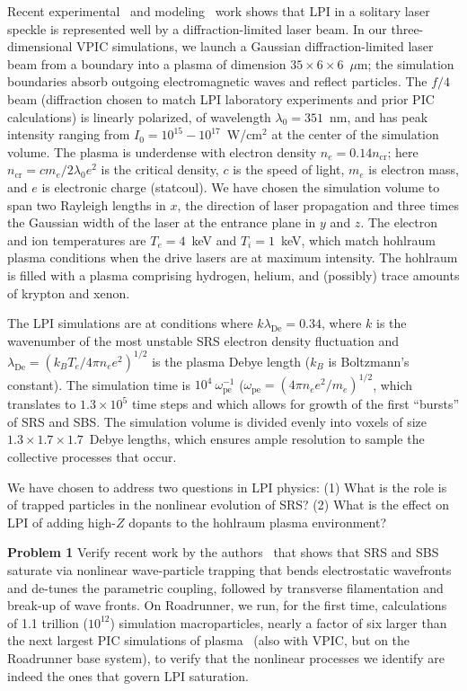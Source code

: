 \documentclass[10pt]{article}
\newcommand{\lde}      {\lambda_{\mathrm{De}}}
\newcommand{\wpe}      {\omega_{\mathrm{pe}}}
\begin{document}
Recent experimental~\cite{Kline_PRL_2005} and modeling~\cite{Yin_et_al_PRL_2007_SRS} work shows that LPI
in a solitary laser speckle is represented well by a
diffraction-limited laser beam.  In our three-dimensional VPIC
simulations, we launch a Gaussian diffraction-limited laser beam from
a boundary into a plasma of dimension $35 \times 6 \times 6$~$\mu$m; 
the simulation boundaries absorb outgoing
electromagnetic waves and reflect particles.  The $f/4$ beam (diffraction
chosen to match LPI laboratory experiments and prior PIC calculations) is
linearly polarized, of wavelength $\lambda_0 = 351$~nm, and has peak
intensity ranging from $I_0 = 10^{15} - 10^{17}$~W/cm$^2$ at the center 
of the simulation volume.  The plasma is
underdense with electron density $n_e = 0.14 n_{\mathrm{cr}}$; here
$n_{\mathrm{cr}} = c m_e / 2 \lambda_0 e^2$ is the critical
density, $c$ is the speed of light, $m_e$ is electron mass, and $e$ is 
electronic charge (statcoul).
We have chosen the simulation volume to span two Rayleigh lengths in
$x$, the direction of laser propagation and three times the Gaussian
width of the laser at the entrance plane in $y$ and $z$.  The electron 
and ion temperatures are $T_e = 4$~keV and $T_i = 1$~keV, which
match hohlraum plasma conditions when the drive lasers are at maximum
intensity.  The hohlraum is filled with a plasma comprising hydrogen,
helium, and (possibly) trace amounts of krypton and xenon.

The LPI simulations are at conditions where $k \lde = 0.34$,
where $k$ is the wavenumber of the most unstable SRS electron density
fluctuation and $\lde = (k_B T_e / 4 \pi n_e e^2)^{1/2}$ is the plasma 
Debye length ($k_B$ is Boltzmann's constant).  The simulation
time is $10^4~\wpe^{-1}$ ($\wpe = (4 \pi n_e e^2 / m_e)^{1/2}$, which
translates to $1.3 \times 10^5$ time steps and which allows for
growth of the first ``bursts'' of SRS and SBS.  The simulation 
volume is divided evenly
into voxels of size $1.3 \times 1.7 \times 1.7$~Debye lengths,
which ensures ample resolution to sample the collective processes that 
occur. 

We have chosen to address two questions in LPI physics: (1) What is 
the role is of trapped particles in the nonlinear evolution of SRS?  
(2) What is the effect on LPI of adding high-$Z$ dopants to the 
hohlraum plasma environment?

\textbf{Problem 1}
Verify recent work by the authors~\cite{Yin_et_al_PRL_2007_SRS,Yin_et_al_Phys_Plasmas_2007_SRS} that shows that SRS and
SBS saturate via nonlinear wave-particle trapping that bends
electrostatic wavefronts and de-tunes the parametric coupling,
followed by transverse filamentation and break-up of wave fronts.  On
Roadrunner, we run, for the first time, calculations of 1.1 trillion
($10^{12}$) simulation macroparticles, nearly a factor of six larger
than the next largest PIC simulations of plasma~\cite{Yin_et_al_PRL_2007_reconnection} (also with
VPIC, but on the Roadrunner base system), to verify that the nonlinear 
processes we identify are indeed the ones that govern LPI saturation.
\end{document}
